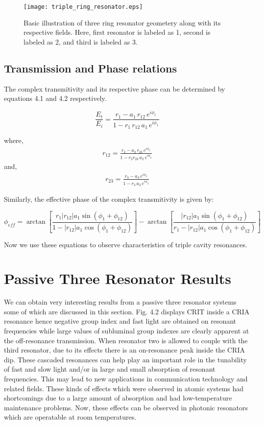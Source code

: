 \begin{figure}[h]
\centering
\texttt{[image: triple\_ring\_resonator.eps]}
\caption{Basic illustration of three ring resonator geometery along with its respective fields. Here, first resonator is labeled as 1, second is labeled as 2, and third is labeled as 3.}
\end{figure}

\subsection{Transmission and Phase relations}
The complex transmitivity and its respective phase can be determined by equations 4.1 and 4.2 respectively. 

\begin{equation}
\frac{E_{t}}{E_{i}} = \frac{r_{1} - a_{1} \, r_{12} \, e^{i\phi_{1}}}{1 - r_{1}\, r_{12}\, a_{1}\, e^{i\phi_{1}}}
\end{equation}

where, 
\begin{align*}
r_{12} = \frac{r_{2} - a_{2}\, r_{23}\, e^{i \phi_{2}}} {1 - r_{2} r_{23}\, a_{2}\, e^{i \phi_{2}}} 
\end{align*}
and,
\begin{align*}
r_{23} = \frac{r_{3} - a_{3}\, e^{i \phi_{3}}} {1 - r_{3}\, a_{3}\, e^{i \phi_{3}}} 
\end{align*}

Similarly, the effective phase of the complex transmitivity is given by:

\begin{equation}
\phi_{eff} = \arctan[{\frac{r_{1} |r_{12}| a_{1} \sin{(\phi_{1} + \phi_{12})}}{1 - |r_{12}| a_{1} \cos{(\phi_{1} + \phi_{12})}}}] - \arctan[{\frac{|r_{12}| a_{1} \sin{(\phi_{1} + \phi_{12})}}{r_{1} - |r_{12}| a_{1} \cos{(\phi_{1} + \phi_{12})}}}]
\end{equation}

Now we use these equations to observe characteristics of triple cavity resonances.

\section{Passive Three Resonator Results}
We can obtain very interesting results from a passive three resonator systems some of which are discussed in this section. Fig. 4.2 displays CRIT inside a CRIA resonance hence negative group index and fast light are obtained on resonant frequencies while large values of subluminal group indexes are clearly apparent at the off-resonance transmission. When resonator two is allowed to couple with the third resonator, due to its effects there is an on-resonance peak inside the CRIA dip. These cascaded resonances can help play an important role in the tunability of fast and slow light and/or in large and small absorption of resonant frequencies. This may lead to new applications in communication technology and related fields. These kinds of effects which were observed in atomic systems had shortcomings due to a large amount of absorption and had low-temperature maintenance problems. Now, these effects can be observed in photonic resonators which are operatable at room temperatures.
